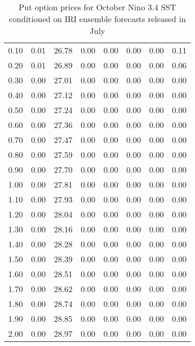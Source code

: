 \begin{table*}[ht]
\begin{tabular}{rrrrrrrr}
  0.10 & 0.01 & 26.78 & 0.00 & 0.00 & 0.00 & 0.00 & 0.11 \\ 
  0.20 & 0.01 & 26.89 & 0.00 & 0.00 & 0.00 & 0.00 & 0.06 \\ 
  0.30 & 0.00 & 27.01 & 0.00 & 0.00 & 0.00 & 0.00 & 0.00 \\ 
  0.40 & 0.00 & 27.12 & 0.00 & 0.00 & 0.00 & 0.00 & 0.00 \\ 
  0.50 & 0.00 & 27.24 & 0.00 & 0.00 & 0.00 & 0.00 & 0.00 \\ 
  0.60 & 0.00 & 27.36 & 0.00 & 0.00 & 0.00 & 0.00 & 0.00 \\ 
  0.70 & 0.00 & 27.47 & 0.00 & 0.00 & 0.00 & 0.00 & 0.00 \\ 
  0.80 & 0.00 & 27.59 & 0.00 & 0.00 & 0.00 & 0.00 & 0.00 \\ 
  0.90 & 0.00 & 27.70 & 0.00 & 0.00 & 0.00 & 0.00 & 0.00 \\ 
  1.00 & 0.00 & 27.81 & 0.00 & 0.00 & 0.00 & 0.00 & 0.00 \\ 
  1.10 & 0.00 & 27.93 & 0.00 & 0.00 & 0.00 & 0.00 & 0.00 \\ 
  1.20 & 0.00 & 28.04 & 0.00 & 0.00 & 0.00 & 0.00 & 0.00 \\ 
  1.30 & 0.00 & 28.16 & 0.00 & 0.00 & 0.00 & 0.00 & 0.00 \\ 
  1.40 & 0.00 & 28.28 & 0.00 & 0.00 & 0.00 & 0.00 & 0.00 \\ 
  1.50 & 0.00 & 28.39 & 0.00 & 0.00 & 0.00 & 0.00 & 0.00 \\ 
  1.60 & 0.00 & 28.51 & 0.00 & 0.00 & 0.00 & 0.00 & 0.00 \\ 
  1.70 & 0.00 & 28.62 & 0.00 & 0.00 & 0.00 & 0.00 & 0.00 \\ 
  1.80 & 0.00 & 28.74 & 0.00 & 0.00 & 0.00 & 0.00 & 0.00 \\ 
  1.90 & 0.00 & 28.85 & 0.00 & 0.00 & 0.00 & 0.00 & 0.00 \\ 
  2.00 & 0.00 & 28.97 & 0.00 & 0.00 & 0.00 & 0.00 & 0.00 \\ 
   \hline
\end{tabular}
\caption{Put option prices for October Nino 3.4 SST conditioned on IRI ensemble forecasts released in July} 
\end{table*}

